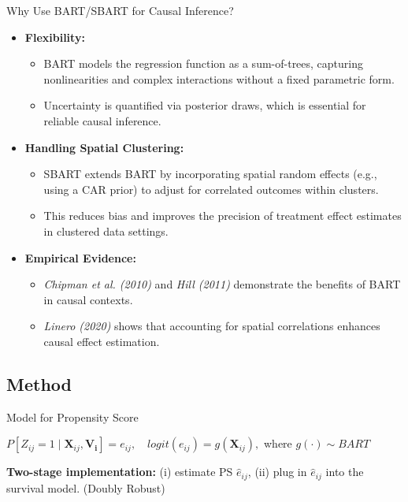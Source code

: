 \documentclass{beamer}
\begin{document}
\begin{frame}{Why Use BART/SBART for Causal Inference?}
    \begin{itemize}
      \item \textbf{Flexibility:}  
        \begin{itemize}
           \item BART models the regression function as a sum-of-trees, capturing nonlinearities and complex interactions without a fixed parametric form.
           \item Uncertainty is quantified via posterior draws, which is essential for reliable causal inference.
        \end{itemize}
      \item \textbf{Handling Spatial Clustering:}  
        \begin{itemize}
           \item SBART extends BART by incorporating spatial random effects (e.g., using a CAR prior) to adjust for correlated outcomes within clusters.
           \item This reduces bias and improves the precision of treatment effect estimates in clustered data settings.
        \end{itemize}
      \item \textbf{Empirical Evidence:}  
        \begin{itemize}
           \item \textit{Chipman et al. (2010)} and \textit{Hill (2011)} demonstrate the benefits of BART in causal contexts.
           \item \textit{Linero (2020)} shows that accounting for spatial correlations enhances causal effect estimation.
        \end{itemize}
    \end{itemize}
  \end{frame}


\subsection{Method}
\begin{frame}{Model for Propensity Score}
   
  $P[Z_{ij}=1\mid \mathbf{X}_{ij},\mathbf{V_i}]=e_{ij}, \quad logit(e_{ij})=g(\mathbf{X}_{ij}),$ where $g(\cdot)\sim BART$
  
  
  
  \vspace{30pt}
  \textbf{Two-stage implementation:} (i) estimate PS $\hat{e}_{ij}$, (ii) plug in $\hat{e}_{ij}$ into the survival model. (Doubly Robust)
  
  \end{frame}
\end{document}
